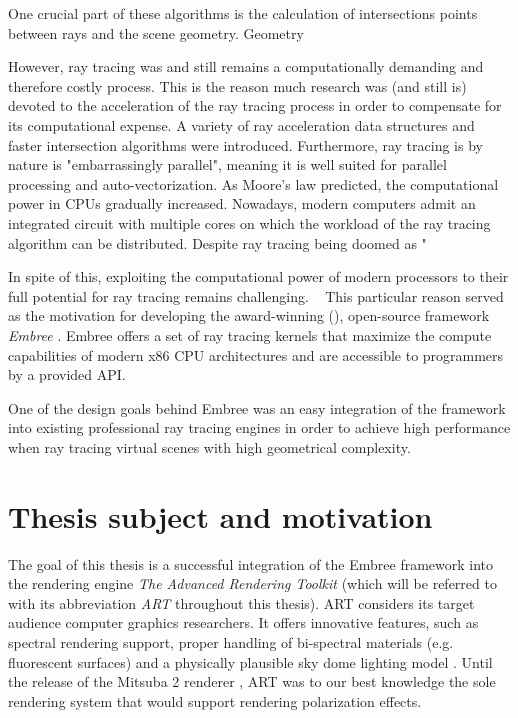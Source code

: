 One crucial part of these algorithms is the calculation of intersections points between rays and the scene geometry. Geometry 

However, ray tracing was and still remains a computationally demanding and therefore costly process. This is the reason much research was (and still is) devoted to the acceleration of the ray tracing process in order to compensate for its computational expense. A variety of ray acceleration data structures and faster intersection algorithms were introduced.
Furthermore, ray tracing is by nature is "embarrassingly parallel", meaning it is well suited for parallel processing and auto-vectorization.
As Moore's law predicted, the computational power in CPUs gradually increased. Nowadays, modern computers admit an integrated circuit with multiple cores on which the workload of the ray tracing algorithm can be distributed. Despite ray tracing being doomed as "

In spite of this, exploiting the computational power of modern processors to their full potential for ray tracing remains challenging.  
This particular reason served as the motivation for developing the award-winning (\cite{embreeAward}), open-source framework \emph{Embree} \cite{wald2014embree}. Embree offers a set of ray tracing kernels that maximize the compute capabilities of modern x86 CPU architectures and are accessible to programmers by a provided API. 

One of the design goals behind Embree was an easy integration of the framework into existing professional ray tracing engines in order to achieve high performance when ray tracing virtual scenes with high geometrical complexity.

\section*{Thesis subject and motivation}
The goal of this thesis is a successful integration of the Embree framework into the rendering engine \emph{The Advanced Rendering Toolkit} \cite{artSoftware} (which will be referred to with its abbreviation \emph{ART} throughout this thesis). ART considers its target audience computer graphics researchers. It offers innovative features, such as spectral rendering support, proper handling of bi-spectral materials (e.g. fluorescent surfaces) and a physically plausible sky dome lighting model \cite{wilkie2013predicting}. Until the release of the Mitsuba 2 renderer \cite{nimier2019mitsuba}, ART was to our best knowledge the sole rendering system that would support rendering polarization effects. 

